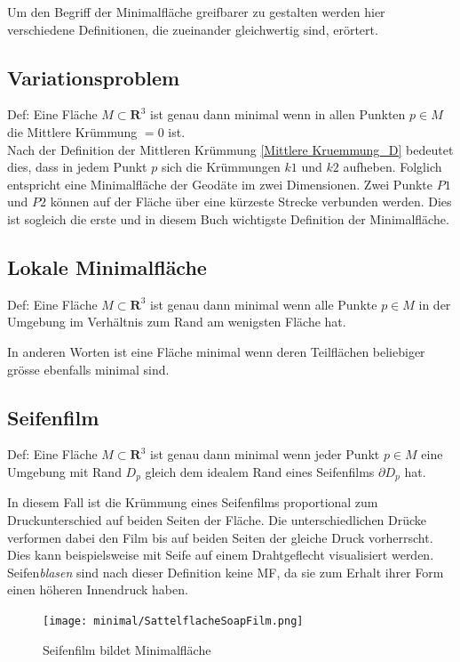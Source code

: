 \begin{refsection}
Um den Begriff der Minimalfläche greifbarer zu gestalten werden hier verschiedene Definitionen, die zueinander gleichwertig sind, erörtert.

\subsection{Variationsproblem}

Def: Eine Fläche $ \textit{M} \subset \mathbf{R}^{3} $ ist genau dann minimal wenn in allen Punkten $p \in M$ die Mittlere Krümmung $=0$ ist.\\
Nach der Definition der Mittleren Krümmung \eqref{Mittlere Kruemmung_D} bedeutet dies, dass in jedem Punkt $p$ sich die Krümmungen $k1$ und $k2$ aufheben.
Folglich entspricht eine Minimalfläche der Geodäte im zwei Dimensionen. Zwei Punkte $P1$ und $P2$ können auf der Fläche über eine kürzeste Strecke verbunden werden.  Dies ist sogleich die erste und in diesem Buch wichtigste Definition der Minimalfläche.

\subsection{Lokale Minimalfläche}

Def: Eine Fläche $ \textit{M} \subset \mathbf{R}^{3} $ ist genau dann minimal wenn alle Punkte $ p \in M $ in der Umgebung  im Verhältnis zum Rand am wenigsten Fläche hat.

In anderen Worten ist eine Fläche minimal wenn deren Teilflächen beliebiger grösse ebenfalls minimal sind.  

\subsection{Seifenfilm}

Def: Eine Fläche $ \textit{M} \subset \mathbf{R}^{3} $ ist genau dann minimal wenn jeder Punkt $p \in M$ eine Umgebung mit Rand $D_p$ gleich dem idealem Rand eines Seifenfilms $\partial D_p$ hat.

In diesem Fall ist die Krümmung eines Seifenfilms proportional zum Druckunterschied auf beiden Seiten der Fläche. Die unterschiedlichen Drücke verformen dabei den Film bis auf beiden Seiten der gleiche Druck vorherrscht. Dies kann beispielsweise mit Seife auf einem Drahtgeflecht visualisiert werden. Seifen\textit{blasen} sind nach dieser Definition keine MF, da sie zum Erhalt ihrer Form einen höheren Innendruck haben.

\begin{figure}[H]
  \centering
  \texttt{[image: minimal/SattelflacheSoapFilm.png]}
  \caption{Seifenfilm bildet Minimalfläche} 
\end{figure}


\end{refsection}
